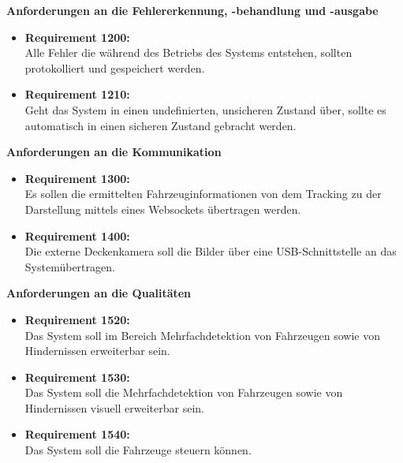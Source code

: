 \textbf{Anforderungen an die Fehlererkennung, -behandlung und -ausgabe}
\begin{itemize}
\item \textbf{Requirement 1200:}\\
Alle Fehler die w\"ahrend des Betriebs des Systems entstehen, sollten protokolliert und
gespeichert werden.
\item \textbf{Requirement 1210:}\\
Geht das System in einen undefinierten, unsicheren Zustand \"uber, sollte es automatisch in einen sicheren Zustand gebracht werden.
\end{itemize}

\textbf{Anforderungen an die Kommunikation}
\begin{itemize}
\item \textbf{Requirement 1300:}\\
Es sollen die ermittelten Fahrzeuginformationen von dem Tracking zu der Darstellung mittels eines Websockets \"ubertragen werden.
\item \textbf{Requirement 1400:}\\
Die externe Deckenkamera soll die Bilder \"uber eine USB-Schnittstelle an das System\"ubertragen.
\end{itemize}

\textbf{Anforderungen an die Qualit\"aten}
\begin{itemize}
\item \textbf{Requirement 1520:}\\
Das System soll im Bereich Mehrfachdetektion von Fahrzeugen sowie von Hindernissen erweiterbar sein.
\item \textbf{Requirement 1530:}\\
Das System soll die Mehrfachdetektion von Fahrzeugen sowie von Hindernissen visuell erweiterbar sein.
\item \textbf{Requirement 1540:}\\
Das System soll die Fahrzeuge steuern k\"onnen.
\end{itemize}